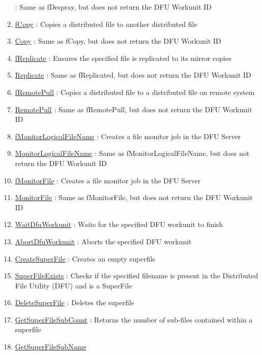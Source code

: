 \begin{enumerate}
: Same as fDespray, but does not return the DFU Workunit ID
\item \hyperlink{ecldoc:file.fcopy}{fCopy}
: Copies a distributed file to another distributed file
\item \hyperlink{ecldoc:file.copy}{Copy}
: Same as fCopy, but does not return the DFU Workunit ID
\item \hyperlink{ecldoc:file.freplicate}{fReplicate}
: Ensures the specified file is replicated to its mirror copies
\item \hyperlink{ecldoc:file.replicate}{Replicate}
: Same as fReplicated, but does not return the DFU Workunit ID
\item \hyperlink{ecldoc:file.fremotepull}{fRemotePull}
: Copies a distributed file to a distributed file on remote system
\item \hyperlink{ecldoc:file.remotepull}{RemotePull}
: Same as fRemotePull, but does not return the DFU Workunit ID
\item \hyperlink{ecldoc:file.fmonitorlogicalfilename}{fMonitorLogicalFileName}
: Creates a file monitor job in the DFU Server
\item \hyperlink{ecldoc:file.monitorlogicalfilename}{MonitorLogicalFileName}
: Same as fMonitorLogicalFileName, but does not return the DFU Workunit ID
\item \hyperlink{ecldoc:file.fmonitorfile}{fMonitorFile}
: Creates a file monitor job in the DFU Server
\item \hyperlink{ecldoc:file.monitorfile}{MonitorFile}
: Same as fMonitorFile, but does not return the DFU Workunit ID
\item \hyperlink{ecldoc:file.waitdfuworkunit}{WaitDfuWorkunit}
: Waits for the specified DFU workunit to finish
\item \hyperlink{ecldoc:file.abortdfuworkunit}{AbortDfuWorkunit}
: Aborts the specified DFU workunit
\item \hyperlink{ecldoc:file.createsuperfile}{CreateSuperFile}
: Creates an empty superfile
\item \hyperlink{ecldoc:file.superfileexists}{SuperFileExists}
: Checks if the specified filename is present in the Distributed File Utility (DFU) and is a SuperFile
\item \hyperlink{ecldoc:file.deletesuperfile}{DeleteSuperFile}
: Deletes the superfile
\item \hyperlink{ecldoc:file.getsuperfilesubcount}{GetSuperFileSubCount}
: Returns the number of sub-files contained within a superfile
\item \hyperlink{ecldoc:file.getsuperfilesubname}{GetSuperFileSubName}

\end{enumerate}
